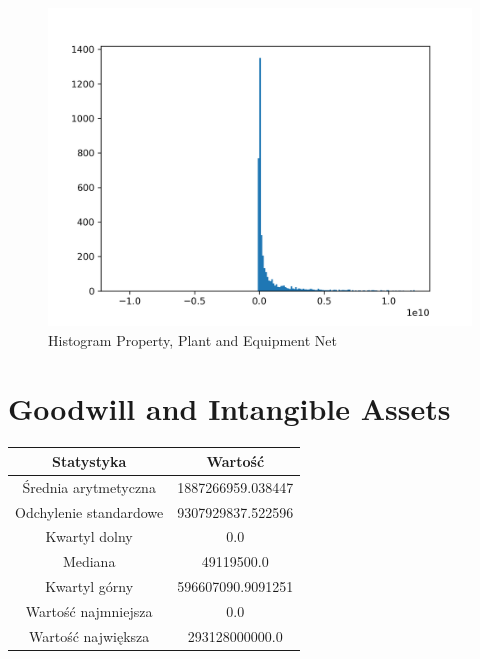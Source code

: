 \documentclass{article}
\begin{document}
\begin{figure}[h!]
    \includegraphics[width=\linewidth]{variables/Property, Plant _ Equipment Net.png}
    \caption{Histogram Property, Plant and Equipment Net }
\end{figure}\section{ Goodwill and Intangible Assets }

\begin{center}
    \begin{tabular}{|c | c|} 
    \hline
    Statystyka & Wartość \\
    \hline\hline
    Średnia arytmetyczna & 1887266959.038447 \\ 
    \hline
    Odchylenie standardowe & 9307929837.522596 \\
    \hline
    Kwartyl dolny & 0.0 \\
    \hline
    Mediana & 49119500.0 \\
    \hline
    Kwartyl górny & 596607090.9091251 \\
    \hline
    Wartość najmniejsza & 0.0 \\
    \hline
    Wartość największa & 293128000000.0 \\
    \hline
   \end{tabular}
\end{center}
\end{document}

